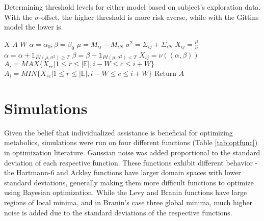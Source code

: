 \begin{algorithm}[t]
\caption{Determining threshold levels for either model based on subject's exploration data. With the $\sigma$-offset, the higher threshold is more risk averse, while with the Gittins model the lower is.}
\label{alg:adapthresh}
\begin{algorithmic}
\State {} $X$
\State {} $A$
\State {} $W$
  \State $\alpha = \alpha_0, \beta = \beta_0$
    \State $\mu = M_{ij} - M_{iN}$
    \State $\sigma^2 = \Sigma_{ij} + \Sigma_{iN}$
      \State $X_{ij} = \frac{\mu}{\sigma}$
    \EndIf
      \State $\alpha = \alpha + \mathbb{1}_{PI(\mu, \sigma^2) \geq T}$
      \State $\beta = \beta + \mathbb{1}_{PI(\mu, \sigma^2) < T}$
      \State $X_{ij} = \nu((\alpha, \beta))$
    \EndIf
  \End
\End
{}
    \State $A_{i} = MAX\{X_{rc}\vert 1 \leq r \leq \vert\mathbb{E}\vert, i-W \leq c \leq i+W\}$
  \EndIf
    \State $A_{i} = MIN\{X_{rc}\vert 1 \leq r \leq \vert\mathbb{E}\vert, i-W \leq c \leq i+W\}$
  \EndIf
\End
\State Return $A$
\end{algorithmic}
\end{algorithm}

\section{Simulations}
Given the belief that individualized assistance is beneficial for optimizing metabolics, simulations were run on four different functions (Table \ref{tab:optfunc}) in optimization literature. Gaussian noise was added proportional to the standard deviation of each respective function. These functions exhibit different behavior - the Hartmann-6 and Ackley functions have larger domain spaces with lower standard deviations, generally making them more difficult functions to optimize using Bayesian optimization. While the Levy and Branin functions have large regions of local minima, and in Branin's case three global minima, much higher noise is added due to the standard deviations of the respective functions.

